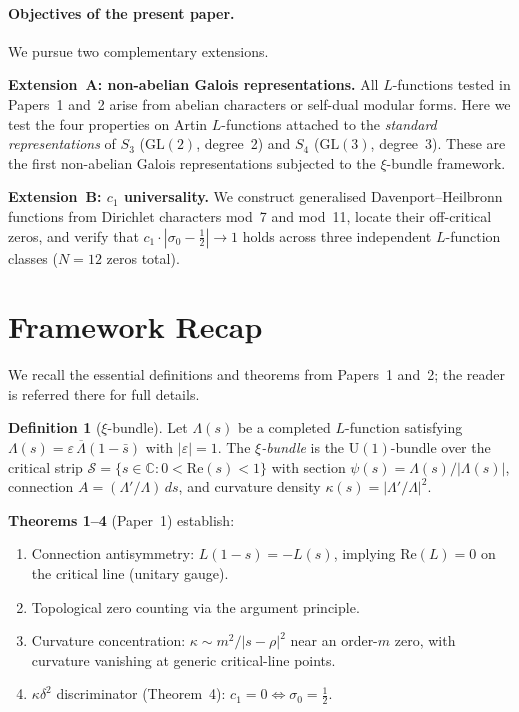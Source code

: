 \documentclass[11pt, a4paper]{article}
\theoremstyle{plain}
\theoremstyle{definition}
\newtheorem{definition}{Definition}[section]
\newcommand{\abs}[1]{\left|#1\right|}
\newcommand{\Lam}{\Lambda}             %
\newcommand{\kap}{\kappa}             %
\begin{document}
\paragraph{Objectives of the present paper.}
We pursue two complementary extensions.

\textbf{Extension~A: non-abelian Galois representations.}
All $L$-functions tested in Papers~1 and~2 arise from abelian
characters or self-dual modular forms.  Here we test the four
properties on Artin $L$-functions attached to the \emph{standard
representations} of $S_{3}$ ($\mathrm{GL}(2)$, degree~2) and $S_{4}$
($\mathrm{GL}(3)$, degree~3).  These are the first non-abelian Galois
representations subjected to the $\xi$-bundle framework.

\textbf{Extension~B: $c_{1}$ universality.}
We construct generalised Davenport--Heilbronn functions from Dirichlet
characters mod~7 and mod~11, locate their off-critical zeros, and
verify that $c_{1}\cdot\abs{\sigma_{0}-\tfrac{1}{2}} \to 1$ holds
across three independent $L$-function classes ($N=12$ zeros total).


\section{Framework Recap}
\label{sec:recap}

We recall the essential definitions and theorems from Papers~1 and~2;
the reader is referred there for full details.

\begin{definition}[$\xi$-bundle]\label{def:bundle}
Let $\Lam(s)$ be a completed $L$-function satisfying
$\Lam(s) = \varepsilon\,\overline{\Lam}(1-\bar{s})$ with
$\abs{\varepsilon}=1$.  The \emph{$\xi$-bundle} is the
$\mathrm{U}(1)$-bundle over the critical strip
$\mathcal{S} = \{s \in \mathbb{C} : 0<\mathrm{Re}(s)<1\}$ with
section $\psi(s) = \Lam(s)/\abs{\Lam(s)}$, connection
$A = (\Lam'/\Lam)\,ds$, and curvature density
$\kap(s) = \abs{\Lam'/\Lam}^{2}$.
\end{definition}

\noindent\textbf{Theorems 1--4} (Paper~1) establish:
\begin{enumerate}
  \item Connection antisymmetry: $L(1-s) = -L(s)$, implying
    $\mathrm{Re}(L)=0$ on the critical line (unitary gauge).
  \item Topological zero counting via the argument principle.
  \item Curvature concentration: $\kap \sim m^{2}/\abs{s-\rho}^{2}$
    near an order-$m$ zero, with curvature vanishing at generic
    critical-line points.
  \item $\kap\delta^{2}$ discriminator (Theorem~4): $c_{1}=0 \iff
    \sigma_{0}=\tfrac{1}{2}$.
\end{enumerate}
\end{document}
